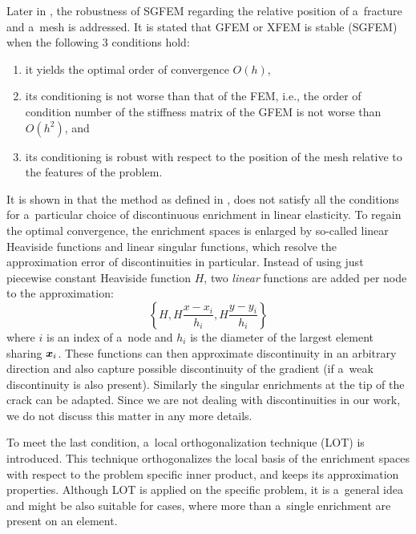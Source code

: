 Later in \cite{zhang_robust_2016}, the robustness of SGFEM regarding the relative position of a~fracture and a~mesh is addressed.
It is stated that GFEM or XFEM is stable (SGFEM) when the following 3 conditions hold:
\begin{enumerate}[label=(\alph*)]
        \item \label{enum:sgfem_conditions_a} it yields the optimal order of convergence $O(h)$,
        \item \label{enum:sgfem_conditions_b} its conditioning is not worse than that of the FEM, i.e., the order of condition number of the stiffness matrix of the
        GFEM is not worse than $O(h^2)$, and
        \item \label{enum:sgfem_conditions_c} its conditioning is robust with respect to the position of the mesh relative to the features of the problem.
\end{enumerate}

It is shown in \cite{zhang_robust_2016} that the method as defined in \cite{babuska_stable_2012,gupta_stable_2013}, %
does not satisfy all the conditions for a~particular choice of discontinuous enrichment in linear elasticity.
To regain the optimal convergence, the enrichment spaces is enlarged by so-called linear Heaviside functions and linear singular functions,
which resolve the approximation error of discontinuities in particular.
Instead of using just piecewise constant Heaviside function $H$, two \emph{linear} functions are added per node to the approximation:
\begin{equation}
    \left\{ H, H\frac{x-x_i}{h_i}, H\frac{y-y_i}{h_i} \right\}
\end{equation}
where $i$ is an index of a~node and $h_i$ is the diameter of the largest element sharing $\mathbf{\boldsymbol{x}}_i$.
These functions can then approximate discontinuity in an arbitrary direction and also capture
possible discontinuity of the gradient (if a~weak discontinuity is also present). Similarly the singular enrichments at the tip of the crack can be adapted.
Since we are not dealing with discontinuities in our work, we do not discuss this matter in any more details.

To meet the last condition, a~local orthogonalization technique (LOT) is introduced.
This technique orthogonalizes the local basis of the enrichment spaces with respect to the problem specific inner product,
and keeps its approximation properties. Although LOT is applied on the specific problem,
it is a~general idea and might be also suitable for cases, where more than a~single enrichment are present on an element.


